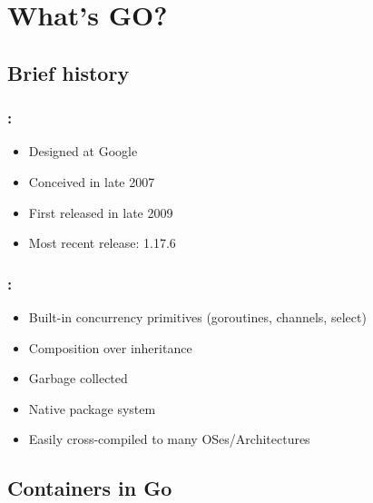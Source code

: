 \section{What's GO?}

\subsection{Brief history}

\begin{frame}
    \frametitle{\secname: \small\subsecname\normalsize}

    \begin{itemize}
        \item Designed at Google
        \item Conceived in late 2007
        \item First released in late 2009
        \item Most recent release: 1.17.6
    \end{itemize}

\end{frame}

\begin{frame}
    \frametitle{\secname: \small\subsecname\normalsize}

    \begin{itemize}
        \item Built-in concurrency primitives (goroutines, channels, select)
        \item Composition over inheritance
        \item Garbage collected
        \item Native package system
        \item Easily cross-compiled to many OSes/Architectures
    \end{itemize}

\end{frame}

\subsection{Containers in Go}

